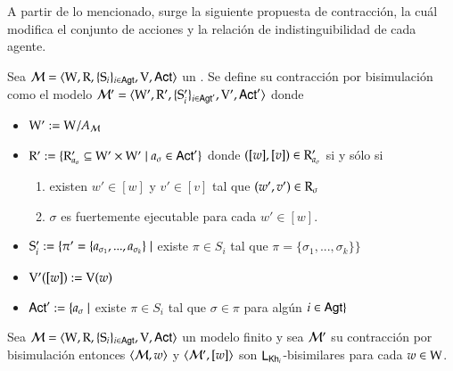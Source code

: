 A partir de lo mencionado, surge la siguiente propuesta de contracción, la cuál modifica el conjunto de acciones y la relación de indistinguibilidad 
de cada agente.


\begin{definicion}
    Sea $\model=\tup{\W,\R,\cset{\S_i}_{i \in \AGT},\V,\ACT}$ un \ults. Se define su contracción por bisimulación como el modelo $\model'=\tup{\W',\R',\cset{\S_i'}_{i \in \AGT'},\V',\ACT'}$ donde 
    \begin{center}
        \begin{itemize}
            \item $\W' := \W/A_\modults$
            \item $\R' := \{\R'_{a_\sigma} \subseteq \W' \times \W' \mid a_\sigma \in \ACT'\}$ donde $([w],[v]) \in \R'_{a_\sigma}$ si y sólo si
            \begin{enumerate}
                \item existen $w' \in [w]$ y $v' \in [v]$ tal que $(w',v')\in \R_\sigma$
                \item $\sigma$ es fuertemente ejecutable para cada $w' \in [w]$.
            \end{enumerate}
            \item $\S_i' := \{ \pi' = \{a_{\sigma_1},...,a_{\sigma_k}\} \mid  
            $ existe $ \pi \in S_i $ tal que $ \pi = \{\sigma_1,...,\sigma_k
            \}\}$
            \item $\V'([w]) := \V(w)$
            \item $\ACT' := \{a_\sigma \mid $ existe $ \pi\in S_i$ tal que $ \sigma \in \pi$ para algún $i \in \AGT \}$ 
        \end{itemize}
    \end{center}
\end{definicion}
    
\begin{teorema}
    Sea $\model=\tup{\W,\R,\cset{\S_i}_{i \in \AGT},\V,\ACT}$ un modelo finito y sea $\modults'$ su contracción por bisimulación entonces $\tup{\modults,w}$ y $\tup{\modults',[w]}$ son $\KHilogic$-bisimilares para cada $w \in \W$.
\end{teorema}

